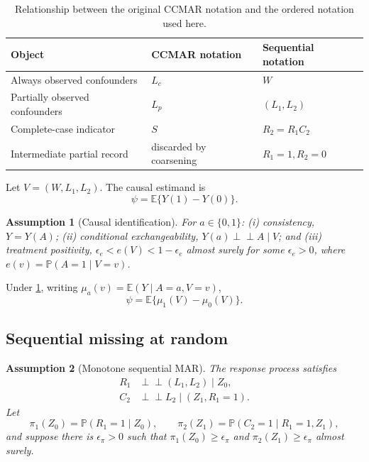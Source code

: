 \documentclass[11pt]{article}
\newtheorem{assumption}{Assumption}
\theoremstyle{definition}
\newcommand{\E}{\mathbb{E}}
\newcommand{\Pp}{\mathbb{P}}
\newcommand{\indep}{\perp\!\!\!\perp}
\newcommand{\1}{\mathbf{1}}
\begin{document}
\begin{table}[ht]
\centering
\caption{Relationship between the original CCMAR notation and the ordered notation used here.}
\label{tab:notation}
\begin{tabularx}{0.92\textwidth}{@{}lXX@{}}
\toprule
Object & CCMAR notation & Sequential notation \\
\midrule
Always observed confounders & $L_c$ & $W$ \\
Partially observed confounders & $L_p$ & $(L_1,L_2)$ \\
Complete-case indicator & $S$ & $R_2=R_1C_2$ \\
Intermediate partial record & discarded by coarsening & $R_1=1,R_2=0$ \\
\bottomrule
\end{tabularx}
\end{table}

Let $V=(W,L_1,L_2)$. The causal estimand is
\[
\psi=\E\{Y(1)-Y(0)\}.
\]

\begin{assumption}[Causal identification]\label{ass:causal}
For $a\in\{0,1\}$: (i) consistency, $Y=Y(A)$; (ii) conditional exchangeability, $Y(a)\indep A\mid V$; and (iii) treatment positivity, $\epsilon_e<e(V)<1-\epsilon_e$ almost surely for some $\epsilon_e>0$, where $e(v)=\Pp(A=1\mid V=v)$.
\end{assumption}

Under \cref{ass:causal}, writing $\mu_a(v)=\E(Y\mid A=a,V=v)$,
\begin{equation}\label{eq:ate-gformula}
\psi=\E\{\mu_1(V)-\mu_0(V)\}.
\end{equation}

\subsection{Sequential missing at random}

\begin{assumption}[Monotone sequential MAR]\label{ass:smar}
The response process satisfies
\begin{align}
R_1&\indep (L_1,L_2)\mid Z_0,\label{eq:mar1}\\
C_2&\indep L_2\mid (Z_1,R_1=1).\label{eq:mar2}
\end{align}
Let
\[
\pi_1(Z_0)=\Pp(R_1=1\mid Z_0),\qquad
\pi_2(Z_1)=\Pp(C_2=1\mid R_1=1,Z_1),
\]
and suppose there is $\epsilon_\pi>0$ such that $\pi_1(Z_0)\ge\epsilon_\pi$ and
$\pi_2(Z_1)\ge\epsilon_\pi$ almost surely.
\end{assumption}
\end{document}
